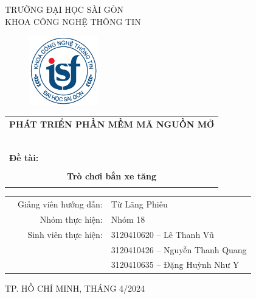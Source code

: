 \documentclass[a4paper]{article}
\begin{document}
\begin{titlepage}
\begin{center}
TRƯỜNG ĐẠI HỌC SÀI GÒN \\
KHOA CÔNG NGHỆ THÔNG TIN
\end{center}
\vspace{1cm}

\begin{figure}[h!]
\begin{center}
\includegraphics[width=3cm]{logoITSGU.png}
\end{center}
\end{figure}

\vspace{1cm}


\begin{center}
\begin{tabular}{c}
	\multicolumn{1}{l}{\textbf{{\Large PHÁT TRIỂN PHẦN MỀM MÃ NGUỒN MỞ}}}\\
	~~\\
	\hline
	\\
	\multicolumn{1}{l}{\textbf{{\Large Đề tài: }}}\\
	\\
	
	\textbf{{\Huge Trò chơi bắn xe tăng}}\\
	\\
	\hline
\end{tabular}
\end{center}

\vspace{3cm}

\begin{table}[h]
\begin{tabular}{rrl}
\hspace{5 cm} & Giảng viên hướng dẫn: &Từ Lãng Phiêu\\
& Nhóm thực hiện: & Nhóm 18\\
& Sinh viên thực hiện: & 3120410620 – Lê Thanh Vũ\\
& & 3120410426 – Nguyễn Thanh Quang \\
& & 3120410635 – Đặng Huỳnh Như Y \\
\end{tabular}
\vspace{1.5 cm}
\end{table}

\begin{center}

{\footnotesize TP. HỒ CHÍ MINH, THÁNG 4/2024}
\end{center}
\end{titlepage}
\end{document}
